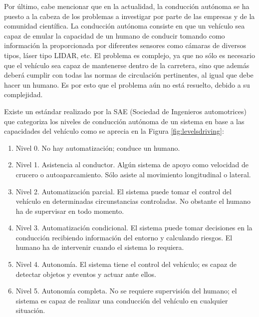 Por último, cabe mencionar que en la actualidad, la conducción autónoma se ha puesto a la cabeza de los problemas a investigar por parte de las empresas y de la comunidad científica. La conducción autónoma consiste en que un vehículo sea capaz de emular la capacidad de un humano de conducir tomando como información la proporcionada por diferentes sensores como cámaras de diversos tipos, láser tipo LIDAR, etc. El problema es complejo, ya que no sólo es necesario que el vehículo sea capaz de mantenerse dentro de la carretera, sino que además deberá cumplir con todas las normas de circulación pertinentes, al igual que debe hacer un humano. Es por esto que el problema aún no está resuelto, debido a su complejidad.

Existe un estándar realizado por la SAE (Sociedad de Ingenieros automotrices) que categoriza los niveles de conducción autónoma de un sistema en base a las capacidades del vehículo como se aprecia en la Figura \ref{fig:levelsdriving}:

\begin{enumerate}
    \item Nivel 0. No hay automatización; conduce un humano.
    \item Nivel 1. Asistencia al conductor. Algún sistema de apoyo como velocidad de crucero o autoaparcamiento. Sólo asiste al movimiento longitudinal o lateral.
    \item Nivel 2. Automatización parcial. El sistema puede tomar el control del vehículo en determinadas circunstancias controladas. No obstante el humano ha de supervisar en todo momento.
    \item Nivel 3. Automatización condicional. El sistema puede tomar decisiones en la conducción recibiendo información del entorno y calculando riesgos. El humano ha de intervenir cuando el sistema lo requiera.
    \item Nivel 4. Autonomía. El sistema tiene el control del vehículo; es capaz de detectar objetos y eventos y actuar ante ellos. 
    \item Nivel 5. Autonomía completa. No se requiere supervisión del humano; el sistema es capaz de realizar una conducción del vehículo en cualquier situación.
\end{enumerate}


